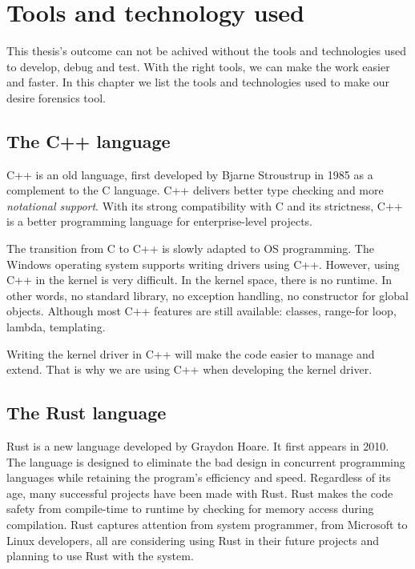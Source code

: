 \chapter[Tools and technology used]{Tools and technology used}

This thesis's outcome can not be achived without the tools and technologies
used to develop, debug and test. With the right tools, we can make the work
easier and faster. In this chapter we list the tools and technologies used to
make our desire forensics tool.

\section[The C++ language]{The C++ language}

C++ is an old language, first developed by Bjarne Stroustrup in 1985 as a
complement to the C language. C++ delivers better type checking and more
\textit{notational support}. With its strong compatibility with C and its
strictness, C++ is a better programming language for enterprise-level projects.

The transition from C to C++ is slowly adapted to OS programming. The Windows
operating system supports writing drivers using C++. However, using C++ in the
kernel is very difficult. In the kernel space, there is no runtime. In other
words, no standard library, no exception handling, no constructor for global
objects.  Although most C++ features are still available: classes, range-for
loop, lambda, templating.

Writing the kernel driver in C++ will make the code easier to manage and
extend. That is why we are using C++ when developing the kernel driver.

\section[The Rust language]{The Rust language}

Rust is a new language developed by Graydon Hoare. It first appears in 2010.
The language is designed to eliminate the bad design in concurrent programming
languages while retaining the program's efficiency and speed.  Regardless of
its age, many successful projects have been made with Rust. Rust makes the code
safety from compile-time to runtime by checking for memory access during
compilation. Rust captures attention from system programmer, from Microsoft to
Linux developers, all are considering using Rust in their future projects and
planning to use Rust with the system.

